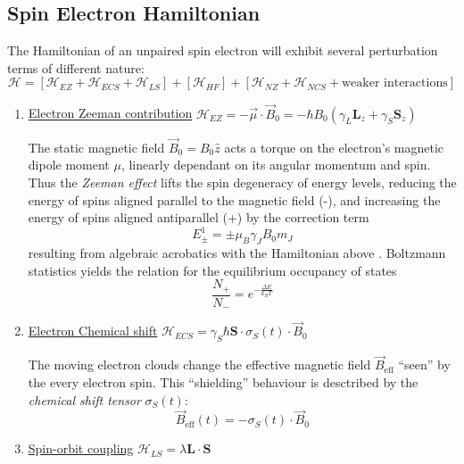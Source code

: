 \documentclass[11.5pt,a4paper]{article}
\begin{document}
\subsection{Spin Electron Hamiltonian}
The Hamiltonian of an unpaired spin electron will exhibit several perturbation terms of different nature:
\begin{equation}
 \mathcal{H} = \left[\mathcal{H}_{EZ} + \mathcal{H}_{ECS} + \mathcal{H}_{LS}\right] + \left[\mathcal{H}_{HF}\right] + \left[\mathcal{H}_{NZ} + \mathcal{H}_{NCS} + \text{weaker interactions}\right]
\end{equation}
\begin{enumerate}
  \item \uline{Electron Zeeman contribution} $\mathcal{H}_{EZ} = - \vec{\mu} \cdot \vec{B}_0 = -\hbar B_0 (\gamma_L \mathbf{L}_z + \gamma_S \mathbf{S}_z)$

  The static magnetic field $\vec{B}_0 = B_0 \hat{z}$ acts a torque on the electron's magnetic dipole moment $\mu$, linearly dependant on its angular momentum and spin. Thus the \emph{Zeeman effect} lifts the spin degeneracy of energy levels, reducing the energy of spins aligned parallel to the magnetic field (-), and increasing the energy of spins aligned antiparallel (+) by the correction term
  \begin{equation}
   E^1_\pm = \pm \mu_B \gamma_J B_0 m_J 
  \end{equation}
  resulting from algebraic acrobatics with the Hamiltonian above \cite[insert]{griffiths}.
  Boltzmann statistics yields the relation for the equilibrium occupancy of states
  \begin{equation}
    \frac{N_+}{N_-} = e^{- \frac{\Delta E}{k_B T}}
  \end{equation}

  \item \uline{Electron Chemical shift} $\mathcal{H}_{ECS} = \gamma_S \hbar \mathbf{S} \cdot \sigma_S(t) \cdot \vec{B}_0$
  
  The moving electron clouds change the effective magnetic field $\vec{B}_\text{eff}$ ``seen'' by the every electron spin. This ``shielding'' behaviour is desctribed by the \emph{chemical shift tensor} $\sigma_S(t)$:
  \begin{equation}
    \vec{B}_\text{eff}(t) = - \sigma_S(t) \cdot \vec{B}_0
  \end{equation}

  \item \uline{Spin-orbit coupling} $\mathcal{H}_{LS} = \lambda \mathbf{L}\cdot \mathbf{S}$


\end{enumerate}
\end{document}

